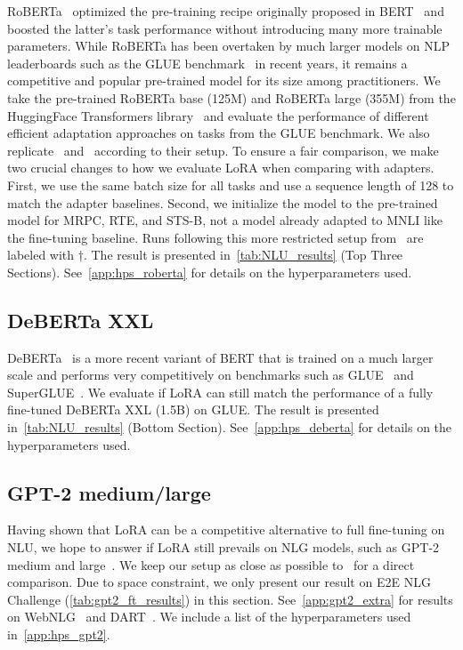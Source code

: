 RoBERTa~\citep{liu2019roberta} optimized the pre-training recipe originally proposed in BERT~\citep{devlin2019bert} and boosted the latter's task performance without introducing many more trainable parameters.
While RoBERTa has been overtaken by much larger models on NLP leaderboards such as the GLUE benchmark~\citep{wang2019glue} in recent years, it remains a competitive and popular pre-trained model for its size among practitioners.
We take the pre-trained RoBERTa base (125M) and RoBERTa large (355M) from the HuggingFace Transformers library~\citep{wolf-etal-2020-transformers} and evaluate the performance of different efficient adaptation approaches on tasks from the GLUE benchmark.
We also replicate~\cite{houlsby_parameter-efficient_2019} and~\cite{pfeiffer2021adapterfusion} according to their setup.
To ensure a fair comparison, we make two crucial changes to how we evaluate LoRA when comparing with adapters.
First, we use the same batch size for all tasks and use a sequence length of 128 to match the adapter baselines.
Second, we initialize the model to the pre-trained model for MRPC, RTE, and STS-B, not a model already adapted to MNLI like the fine-tuning baseline.
Runs following this more restricted setup from~\cite{houlsby_parameter-efficient_2019} are labeled with $\dagger$.
The result is presented in~\autoref{tab:NLU_results} (Top Three Sections).
See~\autoref{app:hps_roberta} for details on the hyperparameters used.



\subsection{DeBERTa XXL}
\label{sec:deberta_expt}
DeBERTa~\citep{he2021deberta} is a more recent variant of BERT that is trained on a much larger scale and performs very competitively on benchmarks such as GLUE~\citep{wang2019glue} and SuperGLUE~\citep{wang2020superglue}.
We evaluate if LoRA can still match the performance of a fully fine-tuned DeBERTa XXL (1.5B) on GLUE.
The result is presented in~\autoref{tab:NLU_results} (Bottom Section).
See~\autoref{app:hps_deberta} for details on the hyperparameters used.

\subsection{GPT-2 medium/large}
\label{sec:gpt2_expt}
Having shown that LoRA can be a competitive alternative to full fine-tuning on NLU, we hope to answer if LoRA still prevails on NLG models, such as GPT-2 medium and large~\citep{radford_language_nodate}.
We keep our setup as close as possible to~\cite{li_prefix-tuning_2021} for a direct comparison.
Due to space constraint, we only present our result on E2E NLG Challenge (\autoref{tab:gpt2_ft_results}) in this section.
See~\autoref{app:gpt2_extra} for results on WebNLG~\citep{gardent2017webnlg} and DART~\citep{nan2020dart}.
We include a list of the hyperparameters used in~\autoref{app:hps_gpt2}.








